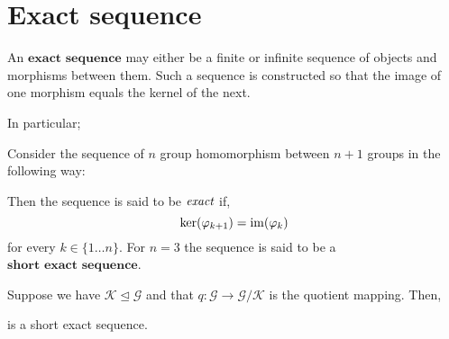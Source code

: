 
\section{Exact sequence} %
\label{sec:exactsequence}
An $\textbf{exact sequence}$ may  either be a finite or infinite sequence of objects and morphisms between them.
Such a sequence is constructed so that the image of one morphism equals the kernel of the next.

In particular;

\begin{defn}
	Consider the sequence of $n$ group homomorphism between $n+1$ groups
	in the following way:

	\begin{center}
\end{center}

Then the sequence is said to be $\emph{exact}$ if,
\[
	\ker(\varphi_{k+1}) = \operatorname{im}(\varphi_{k})
\]
for every $k \in \{1 \dots n\}$. For $n=3$ the sequence is said to be a
$\textbf{short exact sequence}$.
\end{defn}

\begin{exmp}
	Suppose we have $\mathcal{K} \unlhd \mathcal{G}$ and that
	$q: \mathcal{G} \to \mathcal{G} / \mathcal{K}$ is the quotient mapping.
	Then,
	\begin{center}
\end{center}
is a short exact sequence.
\end{exmp}
